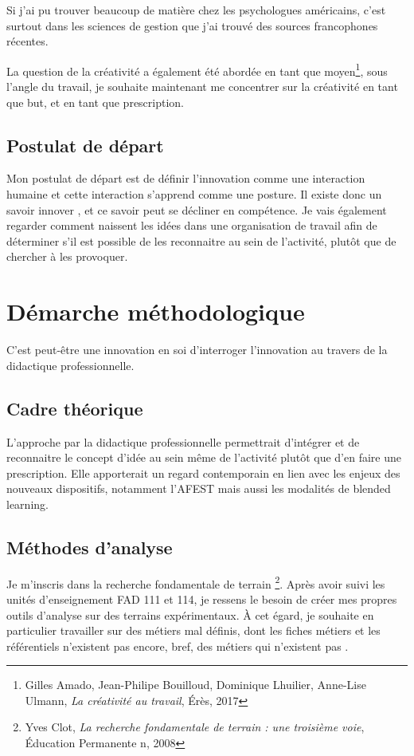 \documentclass{article}
\begin{document}
Si j'ai pu trouver beaucoup de matière chez les psychologues américains, c'est surtout dans les sciences de gestion que j'ai trouvé des sources francophones récentes.

La question de la créativité a également été abordée en tant que moyen\footnote{Gilles Amado, Jean-Philipe Bouilloud, Dominique Lhuilier, Anne-Lise Ulmann, \textit{La créativité au travail}, Érès, 2017}, sous l'angle du travail, je souhaite maintenant me concentrer sur la créativité en tant que but, et en tant que prescription.

\subsection{Postulat de départ}

Mon postulat de départ est de définir l'innovation comme une interaction humaine et cette interaction s'apprend comme une posture. Il existe donc un \og savoir innover \fg{}, et ce savoir peut se décliner en compétence. 
Je vais également regarder comment naissent les idées dans une organisation de travail afin de déterminer s'il est possible de les reconnaitre au sein de l'activité, plutôt que de chercher à les provoquer. 

\section{Démarche méthodologique}

C'est peut-être une innovation en soi d'interroger l'innovation au travers de la didactique professionnelle.

\subsection{Cadre théorique}

L'approche par la didactique professionnelle permettrait d'intégrer et de reconnaitre le concept d'idée au sein même de l'activité plutôt que d'en faire une prescription. Elle apporterait un regard contemporain en lien avec les enjeux des nouveaux dispositifs, notamment l'AFEST mais aussi les modalités de blended learning.

\subsection{Méthodes d'analyse}

Je m'inscris dans la recherche fondamentale de terrain \footnote{Yves Clot, \emph{La recherche fondamentale de terrain : une troisième voie}, Éducation Permanente n, 2008}. Après avoir suivi les unités d'enseignement FAD 111 et 114, je ressens le besoin de créer mes propres outils d'analyse sur des terrains expérimentaux. À cet égard, je souhaite en particulier travailler sur des métiers mal définis, dont les fiches métiers et les référentiels n'existent pas encore, bref, des métiers \og qui n'existent pas \fg{}.
\end{document}
